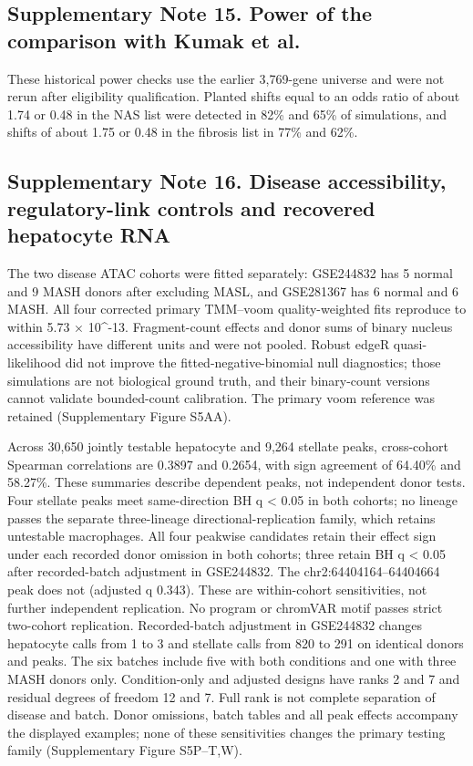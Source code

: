 \subsection{Supplementary Note 15. Power of the comparison with Kumak et al.}\label{supplementary-note-15.-power-of-the-comparison-with-kumak-et-al.}

These historical power checks use the earlier 3,769-gene universe and were not rerun after eligibility qualification. Planted shifts equal to an odds ratio of about 1.74 or 0.48 in the NAS list were detected in 82\% and 65\% of simulations, and shifts of about 1.75 or 0.48 in the fibrosis list in 77\% and 62\%.

\subsection{Supplementary Note 16. Disease accessibility, regulatory-link controls and recovered hepatocyte RNA}\label{supplementary-note-16.-disease-accessibility-regulatory-link-controls-and-recovered-hepatocyte-rna}

The two disease ATAC cohorts were fitted separately: GSE244832 has 5 normal and
9 MASH donors after excluding MASL, and GSE281367 has 6 normal and 6 MASH.
All four corrected primary TMM--voom quality-weighted fits reproduce to within
5.73 × 10\^{}-13. Fragment-count effects and donor sums of binary nucleus
accessibility have different units and were not pooled. Robust edgeR
quasi-likelihood did not improve the fitted-negative-binomial null diagnostics;
those simulations are not biological ground truth, and their binary-count
versions cannot validate bounded-count calibration. The primary voom reference
was retained (Supplementary Figure S5AA).

Across 30,650 jointly testable hepatocyte and 9,264 stellate peaks, cross-cohort
Spearman correlations are 0.3897 and 0.2654, with sign agreement of 64.40\% and
58.27\%. These summaries describe dependent peaks, not independent donor tests.
Four stellate peaks meet same-direction BH q \textless{} 0.05 in both cohorts; no lineage
passes the separate three-lineage directional-replication family, which retains
untestable macrophages. All four peakwise candidates retain their effect sign
under each recorded donor omission in both cohorts; three retain BH q \textless{} 0.05
after recorded-batch adjustment in GSE244832. The chr2:64404164--64404664 peak
does not (adjusted q 0.343). These are within-cohort sensitivities, not further
independent replication. No program or chromVAR motif passes strict two-cohort
replication. Recorded-batch adjustment in GSE244832 changes hepatocyte calls
from 1 to 3 and stellate calls from 820 to 291 on identical donors and peaks.
The six batches include five with both conditions and one with three MASH
donors only. Condition-only and adjusted designs have ranks 2 and 7 and residual
degrees of freedom 12 and 7. Full rank is not complete separation of disease
and batch. Donor omissions, batch tables and all peak effects accompany the
displayed examples; none of these sensitivities changes the primary testing
family (Supplementary Figure S5P--T,W).

